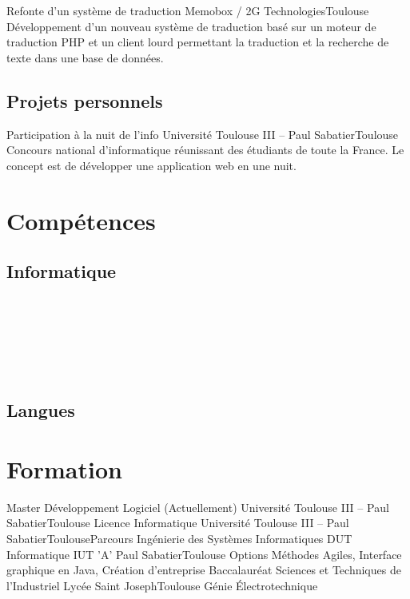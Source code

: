 \documentclass{my_cv_bis}
\begin{document}
	{ Refonte d’un système de traduction }
	{Memobox / 2G Technologies}{Toulouse}
	{Développement d'un nouveau système de traduction basé sur un moteur de traduction PHP et un client lourd
	permettant la traduction et la recherche de texte dans une base de données.  } {}
	\subsection{Projets personnels}
	{Participation à la nuit de l'info}
	{Université Toulouse III -- Paul Sabatier}{Toulouse}
	{ Concours national d’informatique réunissant des étudiants de toute la France. Le concept est de développer une application web en une nuit.} 
	{}
	\vspace{-20px}
\section{Compétences}
		\subsection{Informatique}
		\\
		\\
		\\
		\\
		\\
\vspace{-9px}
		\subsection{Langues}
	\vspace{-10px}
\section{Formation}
	{Master Développement Logiciel (Actuellement)}
	{Université Toulouse III -- Paul Sabatier}{Toulouse}{}{}
	{Licence Informatique}
	{Université Toulouse III -- Paul Sabatier}{Toulouse}{Parcours Ingénierie des Systèmes Informatiques}{}
	{DUT Informatique}
	{IUT 'A' Paul Sabatier}{Toulouse}
	{Options Méthodes Agiles, Interface graphique en Java, Création d'entreprise}
	{}
	{Baccalauréat Sciences et Techniques de l'Industriel}
	{Lycée Saint Joseph}{Toulouse}
	{Génie Électrotechnique}{}
	\vspace{-20px}
\end{document}
